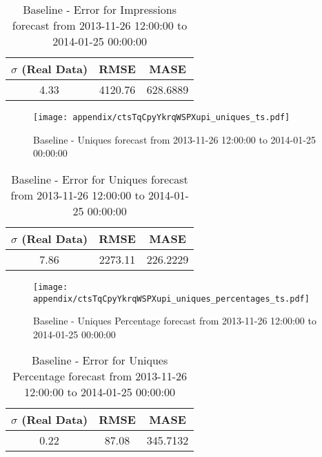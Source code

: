 \begin{table}[H]
\centering
\footnotesize
\begin{tabular}{ccc}
$\sigma$ (Real Data) & RMSE & MASE   \\ \hline
4.33 & 4120.76 & 628.6889 \\
\end{tabular}

\vspace{0.5cm}

\caption[]{
Baseline - Error for Impressions forecast from 2013-11-26 12:00:00 to 2014-01-25 00:00:00}
\end{table}

\begin{figure}[H] \begin{center} \leavevmode
\texttt{[image: appendix/ctsTqCpyYkrqWSPXupi\_uniques\_ts.pdf]} \caption[]{
Baseline - Uniques forecast from 2013-11-26 12:00:00 to 2014-01-25 00:00:00} \label{fig:appendix/ctsTqCpyYkrqWSPXupi_uniques_ts.pdf} \end{center}
\end{figure}

\begin{table}[H]
\centering
\footnotesize
\begin{tabular}{ccc}
$\sigma$ (Real Data) & RMSE & MASE   \\ \hline
7.86 & 2273.11 & 226.2229 \\
\end{tabular}

\vspace{0.5cm}

\caption[]{
Baseline - Error for Uniques forecast from 2013-11-26 12:00:00 to 2014-01-25 00:00:00}
\end{table}

\begin{figure}[H] \begin{center} \leavevmode
\texttt{[image: appendix/ctsTqCpyYkrqWSPXupi\_uniques\_percentages\_ts.pdf]} \caption[]{
Baseline - Uniques Percentage forecast from 2013-11-26 12:00:00 to 2014-01-25 00:00:00} \label{fig:appendix/ctsTqCpyYkrqWSPXupi_uniques_percentages_ts.pdf} \end{center}
\end{figure}

\begin{table}[H]
\centering
\footnotesize
\begin{tabular}{ccc}
$\sigma$ (Real Data) & RMSE & MASE   \\ \hline
0.22 & 87.08 & 345.7132 \\
\end{tabular}

\vspace{0.5cm}

\caption[]{
Baseline - Error for Uniques Percentage forecast from 2013-11-26 12:00:00 to 2014-01-25 00:00:00}
\end{table}

